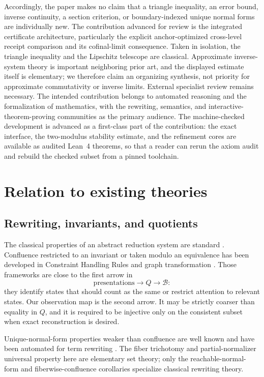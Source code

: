 \documentclass[11pt]{article}
\theoremstyle{definition}
\theoremstyle{remark}
\numberwithin{equation}{section}
\newcommand{\cB}{\mathcal B}
\begin{document}
Accordingly, the paper makes no claim that a triangle inequality, an error
bound, inverse continuity, a section criterion, or boundary-indexed unique
normal forms are individually new.  The contribution advanced for review is
the integrated certificate architecture, particularly the explicit
anchor-optimized cross-level receipt comparison and its cofinal-limit
consequence.  Taken in isolation, the triangle inequality and the Lipschitz
telescope are classical.  Approximate inverse-system theory is important neighboring prior
art, and the displayed estimate itself is elementary; we therefore claim an
organizing synthesis, not priority for approximate commutativity or inverse
limits.  External specialist review remains necessary.
The intended contribution belongs to automated reasoning and the formalization
of mathematics, with the rewriting, semantics, and interactive-theorem-proving
communities as the primary audience.  The machine-checked development is
advanced as a first-class part of the contribution: the exact interface, the
two-modulus stability estimate, and the refinement cores are available as
audited Lean~4 theorems, so that a reader can rerun the axiom audit and rebuild
the checked subset from a pinned toolchain.

\section{Relation to existing theories}\label{sec:related}

\subsection{Rewriting, invariants, and quotients}

The classical properties of an abstract reduction system are standard \citep{Huet1980,BaaderNipkow1998,Terese2003}.  Confluence restricted to an invariant or taken modulo an equivalence has been developed in Constraint Handling Rules and graph transformation \citep{ChristiansenKirkeby2016,GallFruehwirth2018,CampbellPlump2021}.  Those frameworks are close to the first arrow in
\[
 \text{presentations}\longrightarrow Q\longrightarrow\cB:
\]
they identify states that should count as the same or restrict attention to relevant states.  Our observation map is the second arrow.  It may be strictly coarser than equality in $Q$, and it is required to be injective only on the consistent subset when exact reconstruction is desired.

Unique-normal-form properties weaker than confluence are well known and have
been automated for term rewriting \citep{AotoToyama2018}.  The fiber
trichotomy and partial-normalizer universal property here are elementary set
theory; only the reachable-normal-form and fiberwise-confluence corollaries
specialize classical rewriting theory.
\end{document}
